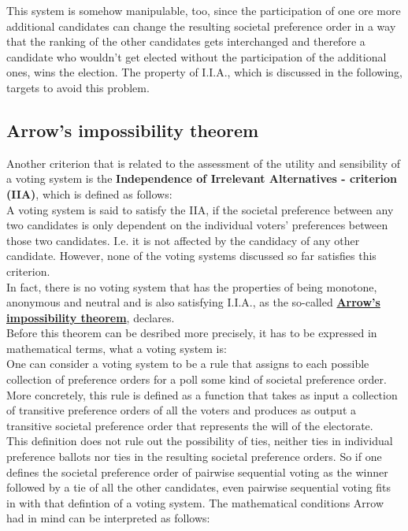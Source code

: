 \begin{itemize}[leftmargin = 0pt, nosep]
This system is somehow manipulable, too, since the participation of one ore more additional candidates can change the resulting societal preference order in a way that the ranking of the other candidates gets interchanged and therefore a candidate who wouldn't get elected without the participation of the additional ones, wins the election. The property of I.I.A., which is discussed in the following, targets to avoid this problem. 
\end{itemize}

\subsection{Arrow's impossibility theorem}
Another criterion that is related to the assessment of the utility and sensibility of a voting system is the {\textbf{Independence of Irrelevant Alternatives - criterion (IIA)}}, which is defined as follows: \\
A voting system is said to satisfy the IIA, if the societal preference between any two candidates is only dependent on the individual voters' preferences between those two candidates. I.e. it is not affected by the candidacy of any other candidate. 
However, none of the voting systems discussed so far satisfies this criterion. \\

In fact, there is no voting system that has the properties of being monotone, anonymous and neutral and is also satisfying I.I.A., as the so-called
\href{https://en.wikipedia.org/wiki/Arrow%27s_impossibility_theorem}{\textbf{Arrow's impossibility theorem}}, 
declares. \\
\noindent Before this theorem can be desribed more precisely, it has to be expressed in mathematical terms, what a voting system is: \\
\noindent One can consider a voting system to be a rule that assigns to each possible collection of preference orders for a poll some kind of societal preference order. More concretely, this rule is defined as a function that takes as input a collection of transitive preference orders of all the voters and produces as output a transitive societal preference order that represents the will of the electorate. \\
\noindent This definition does not rule out the possibility of ties, neither ties in individual preference ballots nor ties in the resulting societal preference orders. So if one defines the societal preference order of pairwise sequential voting as the winner followed by a tie of all the other candidates, even pairwise sequential voting fits in with that defintion of a voting system.
The mathematical conditions Arrow had in mind can be interpreted as follows: \\

